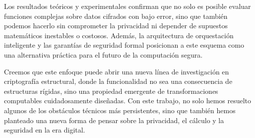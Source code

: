 \documentclass[11pt]{article}
\theoremstyle{plain}
\begin{document}
Los resultados teóricos y experimentales confirman que no solo es posible evaluar funciones complejas sobre datos cifrados con bajo error, sino que también podemos hacerlo sin comprometer la privacidad ni depender de supuestos matemáticos inestables o costosos. Además, la arquitectura de orquestación inteligente y las garantías de seguridad formal posicionan a este esquema como una alternativa práctica para el futuro de la computación segura.

Creemos que este enfoque puede abrir una nueva línea de investigación en criptografía estructural, donde la funcionalidad no sea una consecuencia de estructuras rígidas, sino una propiedad emergente de transformaciones computables cuidadosamente diseñadas. Con este trabajo, no solo hemos resuelto algunos de los obstáculos técnicos más persistentes, sino que también hemos planteado una nueva forma de pensar sobre la privacidad, el cálculo y la seguridad en la era digital.
\end{document}
